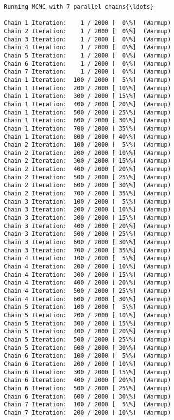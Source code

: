 \documentclass[11pt]{article}
\begin{document}
    \begin{Verbatim}[commandchars=\\\{\}]
Running MCMC with 7 parallel chains{\ldots}

Chain 1 Iteration:    1 / 2000 [  0\%]  (Warmup)
Chain 2 Iteration:    1 / 2000 [  0\%]  (Warmup)
Chain 3 Iteration:    1 / 2000 [  0\%]  (Warmup)
Chain 4 Iteration:    1 / 2000 [  0\%]  (Warmup)
Chain 5 Iteration:    1 / 2000 [  0\%]  (Warmup)
Chain 6 Iteration:    1 / 2000 [  0\%]  (Warmup)
Chain 7 Iteration:    1 / 2000 [  0\%]  (Warmup)
Chain 1 Iteration:  100 / 2000 [  5\%]  (Warmup)
Chain 1 Iteration:  200 / 2000 [ 10\%]  (Warmup)
Chain 1 Iteration:  300 / 2000 [ 15\%]  (Warmup)
Chain 1 Iteration:  400 / 2000 [ 20\%]  (Warmup)
Chain 1 Iteration:  500 / 2000 [ 25\%]  (Warmup)
Chain 1 Iteration:  600 / 2000 [ 30\%]  (Warmup)
Chain 1 Iteration:  700 / 2000 [ 35\%]  (Warmup)
Chain 1 Iteration:  800 / 2000 [ 40\%]  (Warmup)
Chain 2 Iteration:  100 / 2000 [  5\%]  (Warmup)
Chain 2 Iteration:  200 / 2000 [ 10\%]  (Warmup)
Chain 2 Iteration:  300 / 2000 [ 15\%]  (Warmup)
Chain 2 Iteration:  400 / 2000 [ 20\%]  (Warmup)
Chain 2 Iteration:  500 / 2000 [ 25\%]  (Warmup)
Chain 2 Iteration:  600 / 2000 [ 30\%]  (Warmup)
Chain 2 Iteration:  700 / 2000 [ 35\%]  (Warmup)
Chain 3 Iteration:  100 / 2000 [  5\%]  (Warmup)
Chain 3 Iteration:  200 / 2000 [ 10\%]  (Warmup)
Chain 3 Iteration:  300 / 2000 [ 15\%]  (Warmup)
Chain 3 Iteration:  400 / 2000 [ 20\%]  (Warmup)
Chain 3 Iteration:  500 / 2000 [ 25\%]  (Warmup)
Chain 3 Iteration:  600 / 2000 [ 30\%]  (Warmup)
Chain 3 Iteration:  700 / 2000 [ 35\%]  (Warmup)
Chain 4 Iteration:  100 / 2000 [  5\%]  (Warmup)
Chain 4 Iteration:  200 / 2000 [ 10\%]  (Warmup)
Chain 4 Iteration:  300 / 2000 [ 15\%]  (Warmup)
Chain 4 Iteration:  400 / 2000 [ 20\%]  (Warmup)
Chain 4 Iteration:  500 / 2000 [ 25\%]  (Warmup)
Chain 4 Iteration:  600 / 2000 [ 30\%]  (Warmup)
Chain 5 Iteration:  100 / 2000 [  5\%]  (Warmup)
Chain 5 Iteration:  200 / 2000 [ 10\%]  (Warmup)
Chain 5 Iteration:  300 / 2000 [ 15\%]  (Warmup)
Chain 5 Iteration:  400 / 2000 [ 20\%]  (Warmup)
Chain 5 Iteration:  500 / 2000 [ 25\%]  (Warmup)
Chain 5 Iteration:  600 / 2000 [ 30\%]  (Warmup)
Chain 6 Iteration:  100 / 2000 [  5\%]  (Warmup)
Chain 6 Iteration:  200 / 2000 [ 10\%]  (Warmup)
Chain 6 Iteration:  300 / 2000 [ 15\%]  (Warmup)
Chain 6 Iteration:  400 / 2000 [ 20\%]  (Warmup)
Chain 6 Iteration:  500 / 2000 [ 25\%]  (Warmup)
Chain 6 Iteration:  600 / 2000 [ 30\%]  (Warmup)
Chain 7 Iteration:  100 / 2000 [  5\%]  (Warmup)
Chain 7 Iteration:  200 / 2000 [ 10\%]  (Warmup)

\end{Verbatim}
\end{document}
